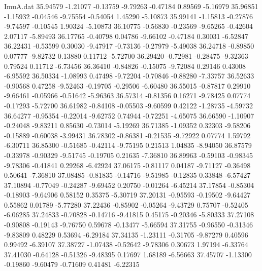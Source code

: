\begin{filecontents}{ImuA.dat}
  35.94579   -1.21077   -0.13759   -9.79263   -0.47184    0.89569   -5.16979
  35.96851   -1.15932   -0.04546   -9.75554   -0.54054    1.45290   -5.10873
  35.99141   -1.15813   -0.27876   -9.74597   -0.10545    1.90324   -5.10873
  36.10775   -0.56830   -0.23569   -9.65265   -0.42604    2.07117   -5.89493
  36.17765   -0.40798    0.04786   -9.66102   -0.47184    0.30031   -6.52847
  36.22431   -0.53599    0.30030   -9.47917   -0.73136   -0.27979   -5.49038
  36.24718   -0.89850    0.07777   -9.82732    0.13880    0.11712   -5.72700
  36.29420   -0.72981   -0.28475   -9.32363    0.79524    0.11712   -6.73456
  36.36410   -0.84826   -0.15075   -9.72084    0.29146    0.43008   -6.95592
  36.50334   -1.08993    0.47498   -9.72204   -0.70846   -0.88280   -7.33757
  36.52633   -0.90568    0.47258   -9.52463   -0.19705   -0.29506   -6.60480
  36.55015   -0.87817    0.29910   -9.66461   -0.05966   -0.51642   -5.96363
  36.57314   -0.81356    0.16271   -9.78425    0.07774   -0.17293   -5.72700
  36.61982   -0.84108   -0.05503   -9.60599    0.42122   -1.28735   -4.59732
  36.64277   -0.95354   -0.22014   -9.62752    0.74944   -0.72251   -4.65075
  36.66590   -1.10907   -0.24048   -9.83211    0.85630   -0.73014   -5.19269
  36.71385   -1.09352    0.32303   -9.58206   -0.15889   -0.60038   -3.99431
  36.78302   -0.86381   -0.21535   -9.72922    0.07774    1.59792   -6.30711
  36.85300   -0.51685   -0.42114   -9.75195    0.21513    1.04835   -8.94050
  36.87579   -0.33978   -0.90329   -9.51745   -0.19705    0.21635   -7.36810
  36.89963   -0.59103   -0.98345   -9.78306   -0.41841    0.29268   -6.42924
  37.06175   -0.81117    0.04187   -9.71127   -0.36498    0.50641   -7.36810
  37.08485   -0.81835   -0.14716   -9.51985   -0.12835    0.33848   -6.57427
  37.10894   -0.77049   -0.24287   -9.69452    0.20750   -0.01264   -6.45214
  37.17854   -0.85304   -0.18903   -9.64906    0.58152    0.35375   -5.30719
  37.20131   -0.95593   -0.19502   -9.64427    0.55862    0.01789   -5.77280
  37.22436   -0.85902   -0.05264   -9.43729    0.75707   -0.52405   -6.06285
  37.24833   -0.70828   -0.14716   -9.41815    0.45175   -0.20346   -5.80333
  37.27108   -0.90808   -0.19143   -9.76750    0.59678   -0.13477   -5.66594
  37.31755   -0.96550   -0.31346   -9.83809    0.48229    0.53694   -6.29184
  37.34135   -1.23111   -0.31705   -9.87279    0.40596    0.99492   -6.39107
  37.38727   -1.07438   -0.52642   -9.78306    0.30673    1.97194   -6.33764
  37.41030   -0.64128   -0.51326   -9.48395    0.17697    1.68189   -6.56663
  37.45707   -1.13300   -0.19860   -9.60479   -0.71609    0.41481   -6.22315

\end{filecontents}
